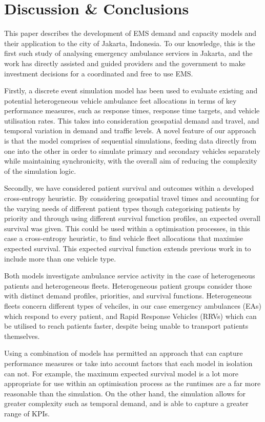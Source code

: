 \documentclass[preprint,12pt]{elsarticle}
\begin{document}
\section{Discussion \& Conclusions}\label{sec:discussion} This paper describes
the development of EMS demand and capacity models and their application to the
city of Jakarta, Indonesia. To our knowledge, this is the first such study of
analysing emergency ambulance services in Jakarta, and the work has directly
assisted and guided providers and the government to make investment decisions
for a coordinated and free to use EMS.

Firstly, a discrete event simulation model has been used to evaluate existing
and potential heterogeneous vehicle ambulance feet allocations in terms of key
performance measures, such as response times, response time targets, and vehicle
utilisation rates. This takes into consideration geospatial demand and travel,
and temporal variation in demand and traffic levels. A novel feature of our
approach is that the model comprises of sequential simulations, feeding data
directly from one into the other in order to simulate primary and secondary
vehicles separately while maintaining synchronicity, with the overall aim of
reducing the complexity of the simulation logic.

Secondly, we have considered patient survival and outcomes within a developed
cross-entropy heuristic. By considering geospatial travel times and accounting
for the varying needs of different patient types though categorising patients by
priority and through using different survival function profiles, an expected
overall survival was given. This could be used within a optimisation processes,
in this case a cross-entropy heuristic, to find vehicle fleet allocations that
maximise expected survival. This expected survival function extends previous
work in \cite{Knight2012918} to include more than one vehicle type.

Both models investigate ambulance service activity in the case of heterogeneous
patients and heterogeneous fleets. Heterogeneous patient groups consider those
with distinct demand profiles, priorities, and survival functions. Heterogeneous
fleets concern different types of vehciles, in our case emergency ambulances
(EAs) which respond to every patient, and Rapid Response Vehicles (RRVs) which
can be utilised to reach patients faster, despite being unable to transport
patients themselves.

Using a combination of models has permitted an approach that can capture
performance measures or take into account factors that each model in isolation
can not. For example, the maximum expected survival model is a lot more
appropriate for use within an optimisation process as the runtimes are a far
more reasonable than the simulation. On the other hand, the simulation allows
for greater complexity such as temporal demand, and is able to capture a greater
range of KPIs.
\end{document}
